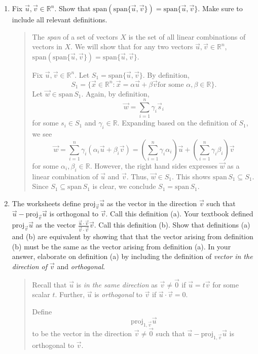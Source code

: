 \documentclass[letter]{article}
\newcommand{\R}{\mathbb{R}}
\newcommand{\Proj}{\mathrm{proj}}
\newcommand{\Span}{\mathrm{span}}
\begin{document}
\begin{enumerate}
		\item Fix $\vec u,\vec v\in \R^n$.  Show that $\Span(\Span\{\vec u,\vec v\})=\Span\{\vec u,\vec v\}$.
			Make sure to include all relevant definitions.
			\begin{quote}
				The \emph{span} of a set of vectors $X$ is the set of all linear combinations of 
				vectors in $X$.  We will show that for any two vectors $\vec u,\vec v\in \R^n$, 
				$\Span(\Span\{\vec u,\vec v\})=\Span\{\vec u,\vec v\}$.

				Fix $\vec u,\vec v\in \R^n$.  Let $S_1=\Span\{\vec u,\vec v\}$. By definition,
				\[
					S_1=\{\vec x\in\R^n:\vec x=\alpha\vec u+\beta\vec v\text{
					for some }\alpha,\beta\in \R\}.
				\]
				Let $\vec w\in \Span \,S_1$.  Again, by definition,
				\[
					\vec w=\sum_{i=1}^n \gamma_i\vec s_i
				\]
				for some $s_i\in S_1$ and $\gamma_i\in \R$.  Expanding based on the definition
				of $S_1$, we see
				\[
					\vec w =\sum_{i=1}^n \gamma_i (\alpha_i\vec u+\beta_i\vec v)=
					\left(\sum_{i=1}^n \gamma_i \alpha_i\right)\vec u+
					\left(\sum_{i=1}^n \gamma_i \beta_i\right)\vec v
				\]
				for some $\alpha_i,\beta_i\in \R$. However, the right hand sides expresses
				$\vec w$ as a linear combination of $\vec u$ and $\vec v$.  Thus, $\vec w\in S_1$.
				This shows $\Span\, S_1\subseteq S_1$.  Since $S_1 \subseteq \Span\,S_1$ is clear,
				we conclude $S_1=\Span\,S_1$.
			\end{quote}
		
		\item The worksheets define $\Proj_{\vec v}\vec u$ as the vector in the direction $\vec v$ such that
			$\vec u-\Proj_{\vec v}\vec u$ is orthogonal to $\vec v$.  Call this definition (a).  Your textbook
			defined $\Proj_{\vec v}\vec u$ as the vector $\frac{\vec u\cdot \vec v}{\vec v\cdot\vec v}\vec v$.
			Call this definition (b).  Show that definitions (a) and (b) are equivalent by showing 
			that that the vector arising from definition (b) must be the same as the vector
			arising from definition (a).
			In your answer, elaborate on definition (a) by including
			the definition of \emph{vector in the direction of $\vec v$} and \emph{orthogonal}.
			\begin{quote}
				Recall that $\vec u$ is \emph{in the same direction} as $\vec v\neq \vec 0$ if $\vec u=t\vec v$
				for some scalar $t$.  Further, $\vec u$ is \emph{orthogonal}
				to $\vec v$ if $\vec u\cdot \vec v=0$.

				Define
				\[
					\Proj_{1,\vec v}\vec u
				\]
				to be the vector in the direction $\vec v\neq\vec 0$ such that $\vec u-\Proj_{1,\vec v}\vec u$
				is orthogonal to $\vec v$.


\end{quote}
\end{enumerate}
\end{document}
